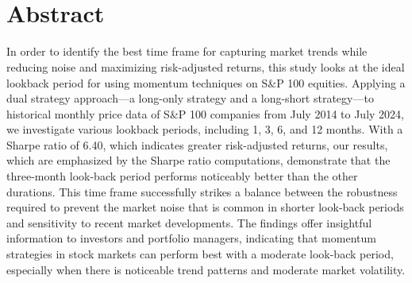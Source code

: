 \documentclass[11pt,a4paper,english,oneside]{book}
\begin{document}
\thispagestyle{empty}
\titleGP\

\newpage

\doublespacing\
\setcounter{page}{1}

\section*{Abstract}
In order to identify the best time frame for capturing market trends while reducing noise and maximizing risk-adjusted returns, this study looks at the ideal lookback period for using momentum techniques on S\&P 100 equities. Applying a dual strategy approach—a long-only strategy and a long-short strategy—to historical monthly price data of S\&P 100 companies from July 2014 to July 2024, we investigate various lookback periods, including 1, 3, 6, and 12 months. With a Sharpe ratio of 6.40, which indicates greater risk-adjusted returns, our results, which are emphasized by the Sharpe ratio computations, demonstrate that the three-month look-back period performs noticeably better than the other durations. This time frame successfully strikes a balance between the robustness required to prevent the market noise that is common in shorter look-back periods and sensitivity to recent market developments. The findings offer insightful information to investors and portfolio managers, indicating that momentum strategies in stock markets can perform best with a moderate look-back period, especially when there is noticeable trend patterns and moderate market volatility.
\newpage
{}

\tableofcontents
\listoffigures
\listoftables

\newpage
{}




\end{document}
